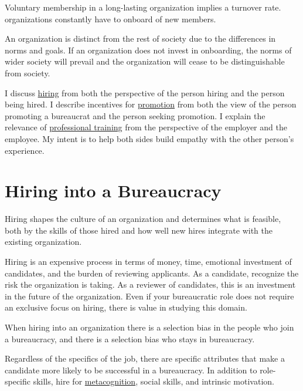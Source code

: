 
Voluntary membership in a long-lasting organization implies a turnover rate. organizations constantly have to onboard of new members.

An organization is distinct from the rest of society due to the differences in norms and goals. If an organization does not invest in onboarding, the norms of wider society will prevail and the organization will cease to be distinguishable from society.

I discuss \hyperref[sec:hiring]{hiring} from both the perspective of the person hiring and the person being hired. 
I describe incentives for \hyperref[sec:promotion]{promotion} from both the view of the person promoting a bureaucrat and the person seeking promotion. 
I explain the relevance of \hyperref[sec:professional-training]{professional training} from the perspective of the employer and the employee. My intent is to help both sides build empathy with the other person's experience. 


\section{Hiring into a Bureaucracy\label{sec:hiring}}


Hiring shapes the culture of an organization and determines what is feasible, both by the skills of those hired and how well new hires integrate with the existing organization. 

Hiring is an expensive process in terms of money, time, emotional investment of candidates, and the burden of reviewing applicants. 
As a candidate, recognize the risk the organization is taking. 
As a reviewer of candidates, this is an investment in the future of the organization. Even if your bureaucratic role does not require an exclusive focus on hiring, there is value in studying this domain. 

When hiring into an organization there is a selection bias in the people who join a bureaucracy, and there is a selection bias who stays in bureaucracy. 


Regardless of the specifics of the job, there are specific attributes that make a candidate more likely to be successful in a bureaucracy. In addition to role-specific skills, hire for \href{https://en.wikipedia.org/wiki/Metacognition}{metacognition}, social skills, and intrinsic motivation.




